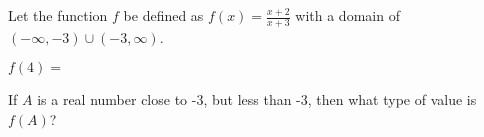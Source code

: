 \documentclass{ximera}
\begin{document}
\begin{definition}
Let the function $f$ be defined as $f(x) = \frac{x+2}{x+3}$ with a domain of $(-\infty, -3) \cup (-3, \infty)$. 

\end{definition}




\begin{exercise}
$f(4) = $  
\end{exercise}





\begin{exercise}
If $A$ is a real number close to -3, but less than -3, then what type of value is $f(A)$?

\begin{multipleChoice}
\end{multipleChoice}

\end{exercise}
\end{document}
